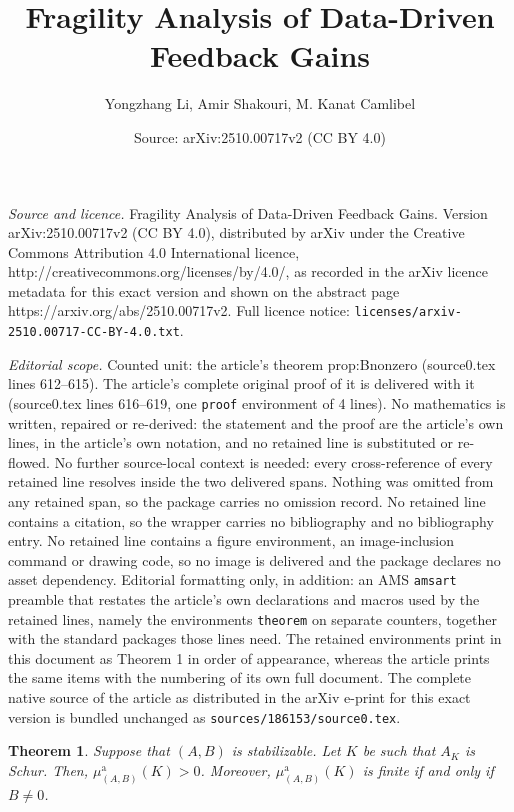 \documentclass[10pt,a4paper]{amsart}
\title{Fragility Analysis of Data-Driven Feedback Gains}
\author{Yongzhang Li, Amir Shakouri, M. Kanat Camlibel}
\date{Source: arXiv:2510.00717v2 (CC BY 4.0)}
\newtheorem{theorem}{Theorem}
\begin{document}
\maketitle

\noindent\emph{Source and licence.} Fragility Analysis of Data-Driven Feedback Gains. Version arXiv:2510.00717v2 (CC BY 4.0), distributed by arXiv under the Creative Commons Attribution 4.0 International licence, http://creativecommons.org/licenses/by/4.0/, as recorded in the arXiv licence metadata for this exact version and shown on the abstract page https://arxiv.org/abs/2510.00717v2. Full licence notice: \texttt{licenses/arxiv-2510.00717-CC-BY-4.0.txt}.\par\smallskip

\noindent\textit{Editorial scope.} Counted unit: the article's theorem prop:Bnonzero (source0.tex lines 612--615). The article's complete original proof of it is delivered with it (source0.tex lines 616--619, one \texttt{proof} environment of 4 lines). No mathematics is written, repaired or re-derived: the statement and the proof are the article's own lines, in the article's own notation, and no retained line is substituted or re-flowed.  No further source-local context is needed: every cross-reference of every retained line resolves inside the two delivered spans.  Nothing was omitted from any retained span, so the package carries no omission record.  No retained line contains a citation, so the wrapper carries no bibliography and no bibliography entry.  No retained line contains a figure environment, an image-inclusion command or drawing code, so no image is delivered and the package declares no asset dependency.  Editorial formatting only, in addition: an AMS \texttt{amsart} preamble that restates the article's own declarations and macros used by the retained lines, namely the environments \texttt{theorem} on separate counters, together with the standard packages those lines need.  The retained environments print in this document as Theorem 1 in order of appearance, whereas the article prints the same items with the numbering of its own full document.  The complete native source of the article as distributed in the arXiv e-print for this exact version is bundled unchanged as \texttt{sources/186153/source0.tex}.
\begin{theorem}
\label{prop:Bnonzero}
Suppose that $(A,B)$ is stabilizable. Let $K$ be such that $A_K$ is Schur. Then, $\mu_{(A,B)}^{\text{a}}(K)>0$. Moreover, $\mu_{(A,B)}^{\text{a}}(K)$ is finite \emph{if and only if} $B\neq 0$. 
\end{theorem}
\end{document}
